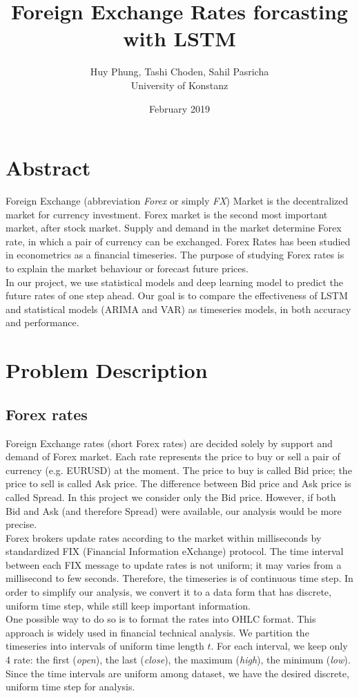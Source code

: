 \documentclass[11pt]{article}
\title{Foreign Exchange Rates forcasting with LSTM}
\author{Huy Phung, Tashi Choden, Sahil Pasricha
  \\University of Konstanz}
\date{February 2019}
\begin{document}
\maketitle
\pagebreak
\tableofcontents
\pagebreak

\section{Abstract}
Foreign Exchange (abbreviation \textit{Forex} or simply \textit{FX}) Market is
the decentralized market for currency investment. Forex market is the second
most important market, after stock market. Supply and demand in the market
determine Forex rate, in which a pair of currency can be exchanged. Forex Rates
has been studied in econometrics as a financial timeseries. The purpose of
studying Forex rates is to explain the market behaviour or forecast future
prices.\\
In our project, we use statistical models and deep learning model to predict the
future rates of one step ahead. Our goal is to compare the effectiveness of LSTM
and statistical models (ARIMA and VAR) as timeseries models, in both accuracy
and performance.


\section{Problem Description}
\subsection{Forex rates}
Foreign Exchange rates (short Forex rates) are decided solely by support and
demand of Forex market. Each rate represents the price to buy or sell a pair of
currency (e.g. EURUSD) at the moment. The price to buy is called Bid price; the
price to sell is called Ask price. The difference between Bid price and Ask
price is called Spread. In this project we consider only the Bid price. However,
if both Bid and Ask (and therefore Spread) were available, our analysis would be
more precise.\\
Forex brokers update rates according to the market
within milliseconds by standardized FIX (Financial Information eXchange)
protocol. The time interval between each FIX message to update rates is not
uniform; it may varies from a millisecond to few seconds. Therefore, the
timeseries is of continuous time step. In order to simplify our
analysis, we convert it to a data form that has discrete, uniform time
step, while still keep important information.\\
One possible way to do so is to format the rates into OHLC format. This approach
is widely used in financial technical analysis. We partition the timeseries into
intervals of uniform time length $t$. For each interval, we keep only 4 rate:
the first (\textit{open}), the last (\textit{close}), the maximum
(\textit{high}), the minimum (\textit{low}). Since the time intervals are
uniform among dataset, we have the desired discrete, uniform time step for
analysis.
\end{document}
